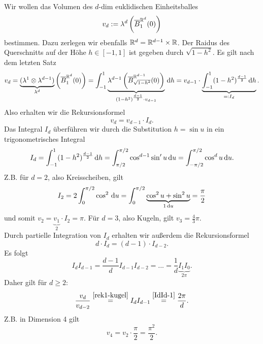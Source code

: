 \begin{example}
Wir wollen das Volumen des $d$-dim euklidischen Einheitsballes 
$$v_d := \lambda^d \left( \overline{B}_1^{\mathbb{R}^d}(0) \right)$$
bestimmen. Dazu zerlegen wir ebenfalls $\mathbb{R}^d=\mathbb{R}^{d-1}\times \mathbb{R}$. Der Raidus des Querschnitts auf der Höhe $h \in [-1,1]$ ist gegeben durch $\sqrt{1-h^2}$. Es gilt nach dem letzten Satz
\begin{equation*}
\begin{split}
v_d = \underbrace{(\lambda^{1} \otimes \lambda^{d-1})}_{\lambda^d} \left( \overline{B}_1^{\mathbb{R}^d}(0) \right) = \int_{-1}^1 \underbrace{\lambda^{d-1} \left( \overline{B}^{\mathbb{R}^{d-1}}_{\sqrt{1-h^2}}(0) \right)}_{(1-h^2)^{\frac{d-1}{2}} \cdot v_{d-1}} \, \mathrm{d} h = v_{d-1} \cdot \underbrace{\int_{-1}^1 (1-h^2)^{\frac{d-1}{2}} \, \mathrm{d} h}_{=:I_d}.
\end{split}
\end{equation*}
Also erhalten wir die Rekursionsformel
\begin{equation}\label{rek1-kugel}
v_d =v_{d-1}\cdot I_d.
\end{equation}
Das Integral $I_d$ überführen wir durch die Substitution $h=\sin u$ in ein trigonometrisches Integral
$$I_d = \int_{-1}^1 (1-h^2)^{\frac{d-1}{2}}\, \mathrm{d} h= \int_{\pi/2}^{\pi/2}\cos^{d-1}\sin'u \, \mathrm{d} u = \int_{-\pi/2}^{\pi/2} \cos^d u \, \mathrm{d} u.$$
Z.B. für $d=2$, also Kreisscheiben, gilt
$$I_2 = 2\int_0^{\pi/2} \cos^2 \, \mathrm{d} u = \int_0^{\pi/2} \underbrace{\cos^2 u+\sin^2 u}_{1\, \mathrm{d} u }= \frac{\pi}{2}$$
und somit $v_2 = \underbrace{v_1}_{2} \cdot I_2 =\pi$. Für $d=3$, also Kugeln, gilt $v_3=\frac{4}{3}\pi$. \vspace{0.5pc}\\
Durch partielle Integration von $I_d$ erhalten wir außerdem die Rekursionsformel
$$d \cdot I_d = (d-1)\cdot I_{d-2}.$$
Es folgt
\begin{equation}\label{IdId-1}
I_dI_{d-1} = \frac{d-1}{d}I_{d-1}I_{d-2}=...=\frac{1}{d}\underbrace{I_1I_0}_{2\pi}.
\end{equation}
Daher gilt für $d\geq 2$:
\begin{equation} \label{vd,vd-2}
\frac{v_d}{v_{d-2}}\overset{\eqref{rek1-kugel}}=I_dI_{d-1}\overset{\eqref{IdId-1}}=\frac{2\pi}{d}.
\end{equation}
Z.B. in Dimension 4 gilt $$v_4=v_2 \cdot \frac{\pi}{2}=\frac{\pi^2}{2}.$$
\end{example}
